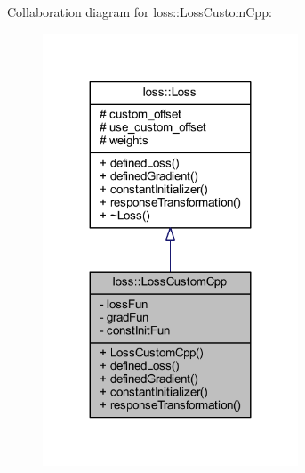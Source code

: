 Collaboration diagram for loss\+:\+:Loss\+Custom\+Cpp\+:\nopagebreak
\begin{figure}[H]
\begin{center}
\leavevmode
\includegraphics[width=215pt]{classloss_1_1_loss_custom_cpp__coll__graph}
\end{center}
\end{figure}
